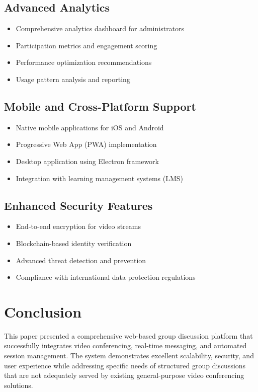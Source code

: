 \documentclass[conference]{IEEEtran}
\begin{document}
\subsection{Advanced Analytics}
\begin{itemize}
\item Comprehensive analytics dashboard for administrators
\item Participation metrics and engagement scoring
\item Performance optimization recommendations
\item Usage pattern analysis and reporting
\end{itemize}

\subsection{Mobile and Cross-Platform Support}
\begin{itemize}
\item Native mobile applications for iOS and Android
\item Progressive Web App (PWA) implementation
\item Desktop application using Electron framework
\item Integration with learning management systems (LMS)
\end{itemize}

\subsection{Enhanced Security Features}
\begin{itemize}
\item End-to-end encryption for video streams
\item Blockchain-based identity verification
\item Advanced threat detection and prevention
\item Compliance with international data protection regulations
\end{itemize}

\section{Conclusion}

This paper presented a comprehensive web-based group discussion platform that successfully integrates video conferencing, real-time messaging, and automated session management. The system demonstrates excellent scalability, security, and user experience while addressing specific needs of structured group discussions that are not adequately served by existing general-purpose video conferencing solutions.
\end{document}
